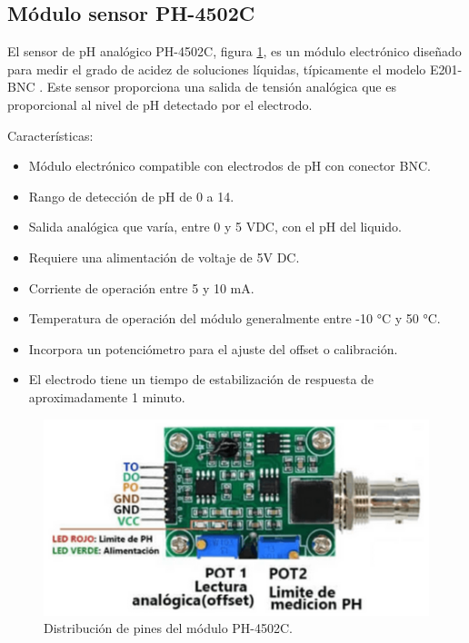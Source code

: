 \subsection{Módulo sensor PH-4502C}
El sensor de pH analógico PH-4502C, figura \ref{fig:ph}, es un módulo electrónico diseñado para medir el grado de acidez de soluciones líquidas, típicamente el modelo E201-BNC \cite{PH:4502C}. Este sensor proporciona una salida de tensión analógica que es proporcional al nivel de pH detectado por el electrodo.

Características:

\begin{itemize}
	\item Módulo electrónico compatible con electrodos de pH con conector BNC.
	\item Rango de detección de pH de 0 a 14.
	\item Salida analógica que varía, entre 0 y 5 VDC, con el pH del liquido.
	\item Requiere una alimentación de voltaje de 5V DC.
	\item Corriente de operación entre 5 y 10 mA.
	\item Temperatura de operación del módulo generalmente entre -10 °C y 50 °C.
	\item Incorpora un potenciómetro para el ajuste del offset o calibración.
	\item El electrodo tiene un tiempo de estabilización de respuesta de aproximadamente 1 minuto.
\end{itemize}

\begin{figure}[h]
\centering
\includegraphics[scale=.5]{./Figures/ph.png}
	\caption{Distribución de pines del módulo PH-4502C\protect\footnotemark.}
	\label{fig:ph}
\end{figure}




